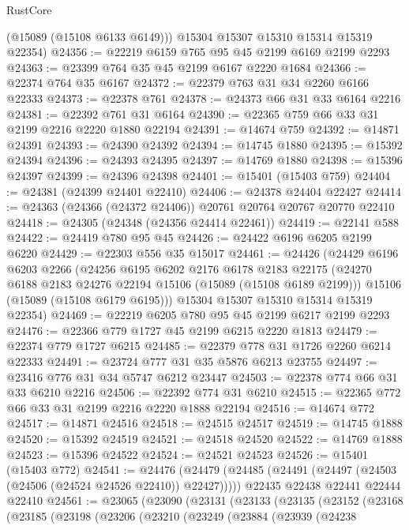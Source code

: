 \begin{lexlean}{RustCore}
\begin{coremodule}
        (@15089 (@15108 @6133 @6149)))
      @15304
      @15307
      @15310
      @15314
      @15319
      @22354)
@24356 := @22219 @6159 @765 @95 @45 @2199 @6169 @2199 @2293
@24363 := @23399 @764 @35 @45 @2199 @6167 @2220 @1684
@24366 := @22374 @764 @35 @6167
@24372 := @22379 @763 @31 @34 @2260 @6166 @22333
@24373 := @22378 @761
@24378 := @24373 @66 @31 @33 @6164 @2216
@24381 := @22392 @761 @31 @6164
@24390 := @22365 @759 @66 @33 @31 @2199 @2216 @2220 @1880 @22194
@24391 := @14674 @759
@24392 := @14871 @24391
@24393 := @24390 @24392
@24394 := @14745 @1880
@24395 := @15392 @24394
@24396 := @24393 @24395
@24397 := @14769 @1880
@24398 := @15396 @24397
@24399 := @24396 @24398
@24401 := @15401 (@15403 @759)
@24404 := @24381 (@24399 @24401 @22410)
@24406 := @24378 @24404 @22427
@24414 := @24363 (@24366 (@24372 @24406)) @20761 @20764 @20767 @20770 @22410
@24418 := @24305 (@24348 (@24356 @24414 @22461))
@24419 := @22141 @588
@24422 := @24419 @780 @95 @45
@24426 := @24422 @6196 @6205 @2199 @6220
@24429 := @22303 @556 @35 @15017
@24461 := @24426
    (@24429
      @6196
      @6203
      @2266
      (@24256
        @6195
        @6202
        @2176
        @6178
        @2183
        @22175
        (@24270 @6188 @2183 @24276 @22194 @15106 (@15089 (@15108 @6189 @2199)))
        @15106
        (@15089 (@15108 @6179 @6195)))
      @15304
      @15307
      @15310
      @15314
      @15319
      @22354)
@24469 := @22219 @6205 @780 @95 @45 @2199 @6217 @2199 @2293
@24476 := @22366 @779 @1727 @45 @2199 @6215 @2220 @1813
@24479 := @22374 @779 @1727 @6215
@24485 := @22379 @778 @31 @1726 @2260 @6214 @22333
@24491 := @23724 @777 @31 @35 @5876 @6213 @23755
@24497 := @23416 @776 @31 @34 @5747 @6212 @23447
@24503 := @22378 @774 @66 @31 @33 @6210 @2216
@24506 := @22392 @774 @31 @6210
@24515 := @22365 @772 @66 @33 @31 @2199 @2216 @2220 @1888 @22194
@24516 := @14674 @772
@24517 := @14871 @24516
@24518 := @24515 @24517
@24519 := @14745 @1888
@24520 := @15392 @24519
@24521 := @24518 @24520
@24522 := @14769 @1888
@24523 := @15396 @24522
@24524 := @24521 @24523
@24526 := @15401 (@15403 @772)
@24541 := @24476
    (@24479 (@24485 (@24491 (@24497 (@24503 (@24506 (@24524 @24526 @22410)) @22427)))))
    @22435
    @22438
    @22441
    @22444
    @22410
@24561 := @23065
    (@23090
      (@23131
        (@23133
          (@23135
            (@23152
              (@23168
                (@23185
                  (@23198
                    (@23206
                      (@23210
                        (@23249
                          (@23884
                            (@23939
                              (@24238

\end{coremodule}
\end{lexlean}
